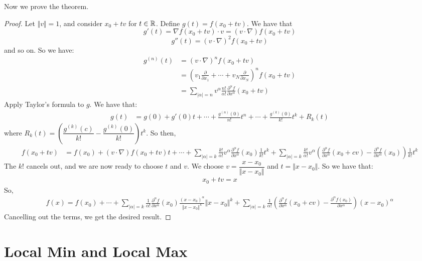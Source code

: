 \documentclass{report}
\begin{document}
\noindent Now we prove the theorem.
\begin{proof}
    Let $\Vert v \Vert = 1$, and consider $x_0 + tv$ for $t \in \RR$. Define $g(t) = f(x_0 + tv)$. We have that $$g'(t) = \nabla f(x_0 + tv) \cdot v = (v \cdot \nabla)f(x_0 + tv)$$ $$g''(t) = (v \cdot \nabla)^2 f(x_0 + tv)$$
    and so on. So we have:
    \begin{align*}
        g^{(n)}(t) &= (v \cdot \nabla)^n f(x_0 + tv) \\
        &= (v_1 \frac{\partial}{\partial x_1} + \cdots + v_N \frac{\partial}{\partial x_N})^n f(x_0 + tv) \\
        &= \sum_{|\alpha| = n} v^\alpha \frac{n!}{\alpha!} \frac{\partial^\alpha f}{\partial x^\alpha}(x_0 + tv)
    \end{align*}
    Apply Taylor's formula to $g$. We have that:
    \begin{align*}
        g(t) &= g(0) + g'(0)t + \cdots + \frac{g^{(n)}(0)}{n!}t^n + \cdots + \frac{g^{(k)}(0)}{k!}t^k + R_k(t)
    \end{align*}
    where $R_k(t) = \left( \dfrac{g^{(k)}(c)}{k!} - \dfrac{g^{(k)}(0)}{k!} \right)t^k$. So then,
    \begin{align*}
        f(x_0 + tv) &= f(x_0) + (v \cdot \nabla)f(x_0 + tv)t + \cdots + \sum_{|\alpha| = k} \frac{k!}{\alpha!}v^\alpha \frac{\partial^\alpha f}{\partial x^\alpha}(x_0) \frac{1}{k!} t^k + \sum_{|\alpha| = k}\frac{k!}{\alpha!}v^\alpha \left( \frac{\partial^\alpha f}{\partial x^\alpha}(x_0 + cv) - \frac{\partial^\alpha f}{\partial x^\alpha}(x_0) \right) \frac{1}{k!} t^k
    \end{align*}
    The $k!$ cancels out, and we are now ready to choose $t$ and $v$. We choose $v = \dfrac{x - x_0}{\Vert x - x_0 \Vert}$ and $t = \Vert x - x_0 \Vert$. So we have that:
    \begin{align*}
        x_0 + tv = x
    \end{align*}
    So, 
    \begin{align*}
        f(x) = f(x_0) + \cdots + \sum_{|\alpha| = k} \frac{1}{\alpha!} \frac{\partial^\alpha f}{\partial x^\alpha}(x_0) \frac{(x-x_0)^\alpha}{\Vert x - x_0 \Vert^k} \Vert x - x_0 \Vert^k + \sum_{|\alpha| = k} \frac{1}{\alpha!} \left(\frac{\partial^\alpha f}{\partial x^\alpha}(x_0 + cv)  - \frac{\partial^\alpha f(x_0)}{\partial x^\alpha}\right)(x - x_0)^\alpha 
    \end{align*}
    Cancelling out the terms, we get the desired result.
\end{proof}
\newpage
\section{Local Min and Local Max}
\end{document}
